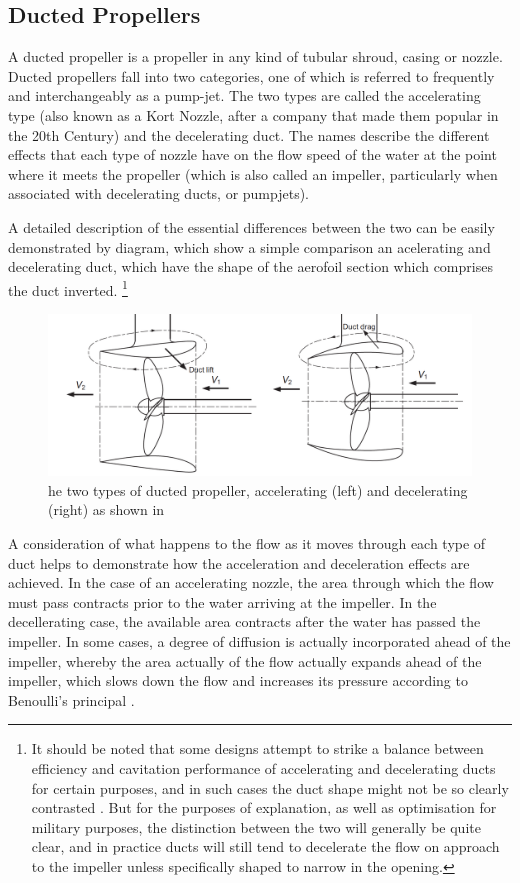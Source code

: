 \documentclass{article}\usepackage[]{graphicx}\usepackage[]{color}
\begin{document}
\subsection{Ducted Propellers}
A ducted propeller is a propeller in any kind of tubular shroud, casing or nozzle.  Ducted propellers fall into two categories, one of which is referred to frequently and interchangeably as a pump-jet.  The two types are called the accelerating type (also known as a Kort Nozzle, after a company that made them popular in the 20th Century) and the decelerating duct.  The names describe the different effects that each type of nozzle have on the flow speed of the water at the point where it meets the propeller (which is also called an impeller, particularly when associated with decelerating ducts, or pumpjets).

A detailed description of the essential differences between the two can be easily demonstrated by diagram, which show a simple comparison an acelerating and decelerating duct, which have the shape of the aerofoil section which comprises the duct inverted. \footnote{It should be noted that some designs attempt to strike a balance between efficiency and cavitation performance of accelerating and decelerating ducts for certain purposes, and in such cases the duct shape might not be so clearly contrasted \parencite{abdel2010}.  But for the purposes of explanation, as well as optimisation for military purposes, the distinction between the two will generally be quite clear, and in practice ducts will still tend to decelerate the flow on approach to the impeller unless specifically shaped to narrow in the opening.}

\begin{figure}
\includegraphics[width=\textwidth]{AccelDecel.png}
\caption{he two types of ducted propeller, accelerating (left) and decelerating (right) as shown in \parencite[249]{mollard2011}}
\label{fig:AccelDecel.png}
\end{figure}

A consideration of what happens to the flow as it moves through each type of duct helps to demonstrate how the acceleration and deceleration effects are achieved. In the case of an accelerating nozzle, the area through which the flow must pass contracts prior to the water arriving at the impeller.  In the decellerating case, the available area contracts after the water has passed the impeller. In some cases, a degree of diffusion is actually incorporated ahead of the impeller, whereby the area actually of the flow actually expands ahead of the impeller, which slows down the flow and increases its pressure according to Benoulli's principal \parencite{wislicenus1973}.
\end{document}

